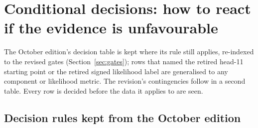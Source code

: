 \documentclass[10pt,a4paper]{article}
\begin{document}
\section{Conditional decisions: how to react if the evidence is unfavourable}
\label{sec:conditional}

The October edition's decision table is kept where its rule still applies, re-indexed to the revised gates
(Section~\ref{sec:gates}); rows that named the retired head-11 starting point or the retired signed likelihood
label are generalised to any component or likelihood metric. The revision's contingencies follow in a second
table. Every row is decided before the data it applies to are seen.

\subsection{Decision rules kept from the October edition}
\label{sec:conditional-kept}
\end{document}
